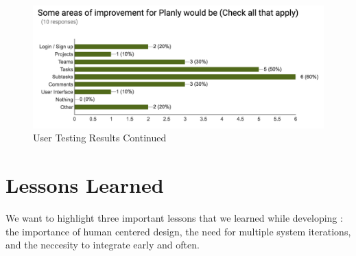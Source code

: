 \begin{figure}[ht]
\centering
\includegraphics[width=\textwidth]{usertesting2.png}
\caption{User Testing Results Continued}
\label{usertesting2}
\end{figure}

\section{Lessons Learned}
We want to highlight three important lessons that we learned while developing \projectTitle{}: the importance of human centered design, the need for multiple system iterations, and the neccesity to integrate early and often.


